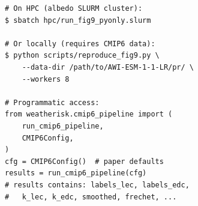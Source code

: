 \documentclass[preprint,12pt,a4paper]{elsarticle}
\newcommand{\revb}[1]{{#1}}
\begin{document}
\begin{lstlisting}[caption={\revb{Running the Figure~9 case study} on HPC or
  locally.}, label=lst:app-fig9]
# On HPC (albedo SLURM cluster):
$ sbatch hpc/run_fig9_pyonly.slurm

# Or locally (requires CMIP6 data):
$ python scripts/reproduce_fig9.py \
    --data-dir /path/to/AWI-ESM-1-1-LR/pr/ \
    --workers 8

# Programmatic access:
from weatherisk.cmip6_pipeline import (
    run_cmip6_pipeline,
    CMIP6Config,
)
cfg = CMIP6Config()  # paper defaults
results = run_cmip6_pipeline(cfg)
# results contains: labels_lec, labels_edc,
#   k_lec, k_edc, smoothed, frechet, ...
\end{lstlisting}



\end{document}

